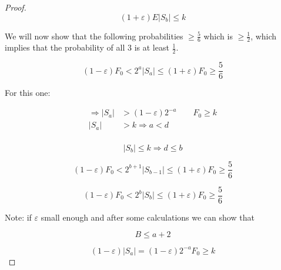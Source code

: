 \documentclass[../notes.tex]{subfiles}
\begin{document}
\begin{proof}
   \begin{equation}
       (1+\varepsilon) E|S_b| \le  k
   \end{equation}


   We will now show that the following probabilities $ \ge  \frac{5}{6}  $ which is $ \ge \frac{1}{2} $, which implies that the probability of all 3 is at least $ \frac{1}{2} $.


   \begin{equation}
       (1-\varepsilon) F_0 < 2^a |S_a| \le  (1+\varepsilon)F_0 \ge  \frac{5}{6}
   \end{equation}

   For this one:


   \begin{equation}
       \begin{split}
           \Rightarrow |S_a| &> (1-\varepsilon) 2^{-a} \qquad F_0 \ge  k  \\
            |S_a| & > k \Rightarrow a < d  \\
       \end{split}
   \end{equation}

   \begin{equation}
       |S_b| \le  k \Rightarrow d \le  b
   \end{equation}
   
   

   
   \begin{equation}
       (1-\varepsilon) F_0 < 2^{b+1} |S_{b-1}| \le  (1+\varepsilon)F_0 \ge  \frac{5}{6}
   \end{equation}


   \begin{equation}
       (1-\varepsilon) F_0 < 2^b |S_b| \le  (1+\varepsilon)F_0 \ge  \frac{5}{6}
   \end{equation}


   Note: if $ \varepsilon $ small enough and after some calculations we can show that 

   \begin{equation}
       B \le  a + 2
   \end{equation}
   
   \begin{equation}
       (1-\varepsilon)|S_a| = (1-\varepsilon) 2^{-a} F_0 \ge k
   \end{equation}

\end{proof}
\end{document}

